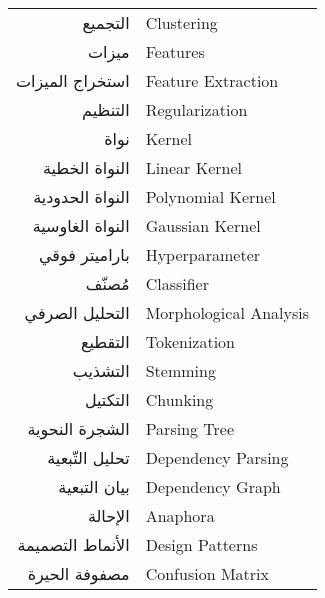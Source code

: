 \begin{doublespacing}
\begin{center}
\begin{longtable}{r l}
			
			التجميع		& 			\textenglish{Clustering}				\\
			
			
			ميزات			& 				\textenglish{Features}				\\
			
			
			استخراج الميزات		& 				\textenglish{Feature Extraction}				\\
			
			
			التنظيم		& 			\textenglish{Regularization}	\\
			
			
			نواة		& 			\textenglish{Kernel}	\\
			
			النواة الخطية		& 			\textenglish{Linear Kernel}		\\
			
			النواة الحدودية		& 			\textenglish{Polynomial Kernel}		\\
			
			النواة الغاوسية		& 			\textenglish{Gaussian Kernel}		\\
			
			باراميتر فوقي		& 			\textenglish{Hyperparameter}		\\
			
			مُصنّف	& 			\textenglish{Classifier}		\\
			
			التحليل الصرفي	& 			\textenglish{Morphological Analysis}		\\
			
			التقطيع		& 			\textenglish{Tokenization}		\\
			
			التشذيب	& 			\textenglish{Stemming}		\\
			
			التكتيل		& 			\textenglish{Chunking}		\\
			
			الشجرة النحوية		& 			\textenglish{Parsing Tree}		\\
			
			تحليل التّبعية		& 			\textenglish{Dependency Parsing}		\\
			
			بيان التبعية		& 			\textenglish{Dependency Graph}		\\
			
			الإحالة		& 			\textenglish{Anaphora}		\\
			
			الأنماط التصميمة		& 			\textenglish{Design Patterns}		\\
			
			مصفوفة الحيرة		& 			\textenglish{Confusion Matrix}		\\
			
		\end{longtable}
	\end{center}
\end{doublespacing}

